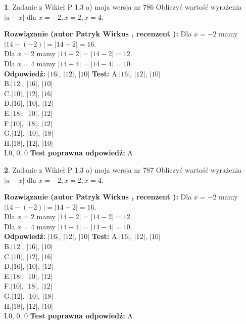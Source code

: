 \documentclass[12pt, a4paper]{article}
\theoremstyle{definition} %
\newtheorem{zad}{}
\newcommand{\zadStart}[1]{\begin{zad}#1\newline}
\newcommand{\zadStop}{\end{zad}}
\newcommand{\rozwStart}[2]{\noindent \textbf{Rozwiązanie (autor #1 , recenzent #2): }\newline}
\newcommand{\rozwStop}{\newline}
\newcommand{\odpStart}{\noindent \textbf{Odpowiedź:}\newline}
\newcommand{\odpStop}{\newline}
\newcommand{\testStart}{\noindent \textbf{Test:}\newline}
\newcommand{\testStop}{\newline}
\newcommand{\kluczStart}{\noindent \textbf{Test poprawna odpowiedź:}\newline}
\newcommand{\kluczStop}{\newline}
\begin{document}
\zadStart{Zadanie z Wikieł P 1.3 a) moja wersja nr 786}
Obliczyć wartość wyrażenia $|a - x|$ dla $x=-2,x=2,x=4$.
\zadStop
\rozwStart{Patryk Wirkus}{}
Dla $x = -2$ mamy $|14 - (-2)| = |14 + 2| = 16$.\\
Dla $x = 2$ mamy $|14 - 2| = |14 - 2| = 12$.\\
Dla $x = 4$ mamy $|14 - 4| = |14 - 4| = 10$.\\
\rozwStop
\odpStart
$|16|$, $|12|$, $|10|$
\odpStop
\testStart
A.$|16|$, $|12|$, $|10|$\\
B.$|12|$, $|16|$, $|10|$\\
C.$|10|$, $|12|$, $|16|$\\
D.$|16|$, $|10|$, $|12|$\\
E.$|18|$, $|10|$, $|12|$\\
F.$|10|$, $|18|$, $|12|$\\
G.$|12|$, $|10|$, $|18|$\\
H.$|18|$, $|12|$, $|10|$\\
I.$0$, $0$, $0$
\testStop
\kluczStart
A
\kluczStop



\zadStart{Zadanie z Wikieł P 1.3 a) moja wersja nr 787}
Obliczyć wartość wyrażenia $|a - x|$ dla $x=-2,x=2,x=4$.
\zadStop
\rozwStart{Patryk Wirkus}{}
Dla $x = -2$ mamy $|14 - (-2)| = |14 + 2| = 16$.\\
Dla $x = 2$ mamy $|14 - 2| = |14 - 2| = 12$.\\
Dla $x = 4$ mamy $|14 - 4| = |14 - 4| = 10$.\\
\rozwStop
\odpStart
$|16|$, $|12|$, $|10|$
\odpStop
\testStart
A.$|16|$, $|12|$, $|10|$\\
B.$|12|$, $|16|$, $|10|$\\
C.$|10|$, $|12|$, $|16|$\\
D.$|16|$, $|10|$, $|12|$\\
E.$|18|$, $|10|$, $|12|$\\
F.$|10|$, $|18|$, $|12|$\\
G.$|12|$, $|10|$, $|18|$\\
H.$|18|$, $|12|$, $|10|$\\
I.$0$, $0$, $0$
\testStop
\kluczStart
A
\kluczStop
\end{document}
